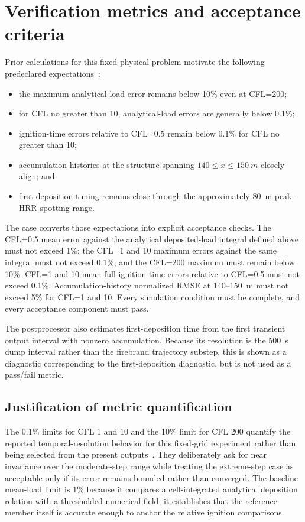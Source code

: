 \section{Verification metrics and acceptance criteria}

Prior calculations for this fixed physical problem motivate the following
predeclared expectations~\cite{Qin2025}:
\begin{itemize}
\item the maximum analytical-load error remains below 10\% even at CFL=200;
\item for CFL no greater than 10, analytical-load errors are generally below
0.1\%;
\item ignition-time errors relative to CFL=0.5 remain below 0.1\% for CFL no
greater than 10;
\item accumulation histories at the structure spanning
\(140\le x\le\SI{150}{m}\) closely align; and
\item first-deposition timing remains close through the approximately
\SI{80}{m} peak-HRR spotting range.
\end{itemize}

The case converts those expectations into explicit acceptance checks. The
CFL=0.5 mean error against the analytical deposited-load integral defined
above must not exceed 1\%; the CFL=1 and 10 maximum errors against the same
integral must not exceed 0.1\%; and the CFL=200 maximum must remain below
10\%. CFL=1 and 10 mean full-ignition-time errors relative to CFL=0.5 must not
exceed 0.1\%. Accumulation-history normalized RMSE at 140--150~m must not
exceed 5\% for CFL=1 and 10. Every simulation condition must be complete, and every
acceptance component must pass.

The postprocessor also estimates first-deposition time from the first transient
output interval with nonzero accumulation. Because its resolution is the
\SI{500}{s} dump interval rather than the firebrand trajectory substep, this is
shown as a diagnostic corresponding to the first-deposition diagnostic, but is not used as a
pass/fail metric.

\subsection{Justification of metric quantification}

The 0.1\% limits for CFL 1 and 10 and the 10\% limit for CFL 200 quantify the
reported temporal-resolution behavior for this fixed-grid experiment rather
than being selected from the present outputs~\cite{Qin2025}.  They deliberately
ask for near invariance over the moderate-step range while treating the
extreme-step case as acceptable only if its error remains bounded rather than
converged.  The baseline mean-load limit is 1\% because it compares a
cell-integrated analytical deposition relation with a thresholded numerical
field; it establishes that the reference member itself is accurate enough to
anchor the relative ignition comparisons.

